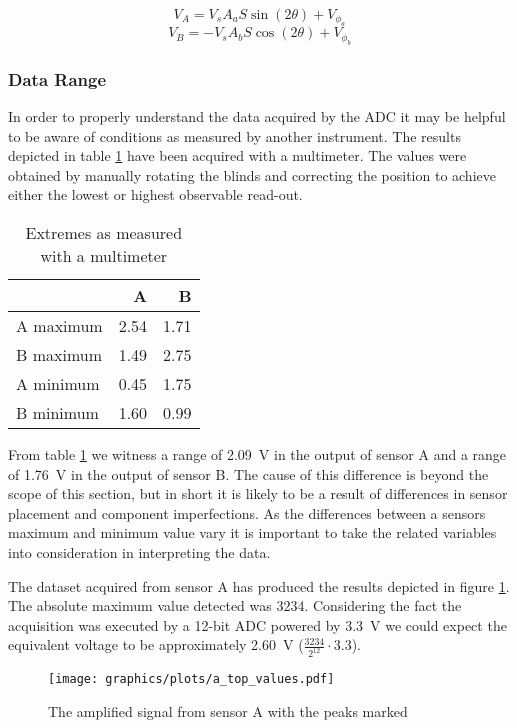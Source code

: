 \documentclass[]{article}
\begin{document}
$$V_A = V_s A_a S\sin(2\theta) + V_{\phi_a}$$
$$V_B = -V_s A_b S\cos(2\theta) + V_{\phi_b}$$

\subsubsection{Data Range}
In order to properly understand the data acquired by the ADC it may be
helpful to be aware of conditions as measured by another instrument. The 
results depicted in table \ref{table:extremes} have been acquired with a 
multimeter. The values were obtained by manually rotating the blinds
and correcting the position to achieve either the lowest or highest observable
read-out.

\begin{table}[h!]
  \begin{center}
    \caption{Extremes as measured with a multimeter}
    \label{table:extremes}
    \begin{tabular}{lrr}
      \toprule
      & A & B \\
      \midrule
      A maximum & 2.54 & 1.71 \\
      B maximum & 1.49 & 2.75 \\
      A minimum & 0.45 & 1.75 \\
      B minimum & 1.60 & 0.99 \\
      \bottomrule
    \end{tabular}
  \end{center}
\end{table}

From table \ref{table:extremes} we witness a range of \SI{2.09}{V} in the 
output of sensor A and a range of \SI{1.76}{V} in the output of sensor B. The
cause of this difference is beyond the scope of this section, but in short it
is likely to be a result of differences in sensor placement and component
imperfections. As the differences between a sensors maximum and minimum value
vary it is important to take the related variables into consideration in 
interpreting the data.

The dataset acquired from sensor A has produced the results depicted in figure 
\ref{fig:a_peak}. The absolute maximum value detected was $3234$. Considering
the fact the acquisition was executed by a 12-bit ADC powered by \SI{3.3}{V}
we could expect the equivalent voltage to be approximately \SI{2.60}{V} ($\frac{3234}{2^{12}}\cdot 3.3$).
\begin{figure}[ht!]
  \centering
  \texttt{[image: graphics/plots/a\_top\_values.pdf]}
	\caption{The amplified signal from sensor A with the peaks marked}
  \label{fig:a_peak}
\end{figure}
\end{document}
